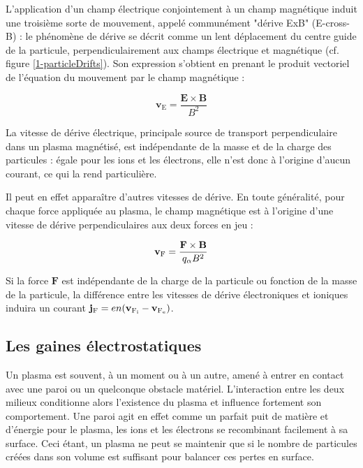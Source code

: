 \begin{refsection}
L'application d'un champ électrique conjointement à un champ magnétique
induit une troisième sorte de mouvement, appelé communément "dérive
ExB" (E-cross-B) : le phénomène de dérive se décrit comme un lent déplacement du
centre guide de la particule, perpendiculairement aux champs électrique et
magnétique (cf. figure \ref{1-particleDrifts}). Son expression s'obtient en
prenant le produit vectoriel de l'équation du mouvement par le champ magnétique
:

\begin{equation}
\mathbf{v}_\text{E}=\frac{\mathbf{E}\times\mathbf{B}}{B^2}
\end{equation}

La vitesse de dérive électrique, principale source de transport perpendiculaire
dans un plasma magnétisé, est indépendante de la masse et de la charge des
particules : égale pour les ions et les électrons, elle n'est donc à
l'origine d'aucun courant, ce qui la rend particulière. 

Il peut en effet apparaître d'autres vitesses de dérive. En toute généralité, 
pour chaque force appliquée au plasma, le champ magnétique est à l'origine
d'une vitesse de dérive perpendiculaires aux deux forces en jeu :

\begin{equation}
\mathbf{v}{_{\text{F}}}=\frac{\mathbf{F}\times\mathbf{B}}{q_\alpha B^2}
\end{equation}

Si la force $\mathbf F$ est indépendante de la charge de la particule ou
fonction de la masse de la particule, la différence entre les vitesses de dérive
électroniques et ioniques induira un courant $\mathbf
j{_{\text{F}}}=en(\mathbf v{_{\text{F}_\text{i}}}-\mathbf
v{_{\text{F}_\text{e}}})$. 

\subsection{Les gaines électrostatiques}
Un plasma est souvent, à un moment ou à un autre, amené à entrer en contact avec
une paroi ou un quelconque obstacle matériel. L'interaction entre
les deux milieux conditionne alors l'existence du plasma et influence
fortement son comportement. Une paroi agit en effet comme un parfait
puit de matière et d'énergie pour le plasma, les ions et les électrons se
recombinant facilement à sa surface. Ceci étant, un plasma ne peut se maintenir
que si le nombre de particules créées dans son volume est suffisant pour
balancer ces pertes en surface. 


\end{refsection}

